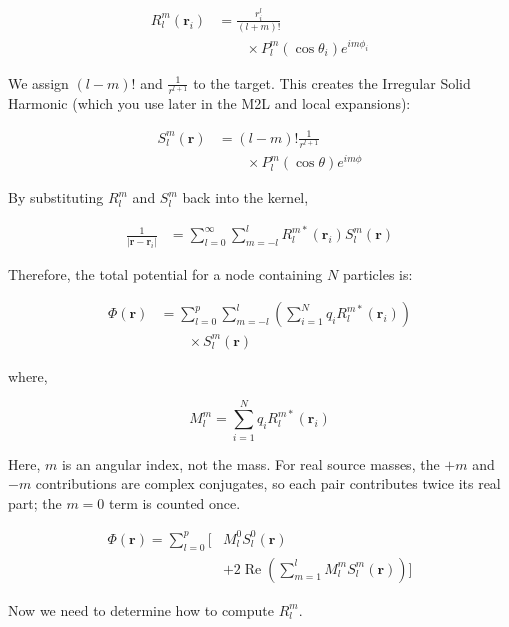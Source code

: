 \[
\begin{aligned}
R_l^m(\mathbf r_i)
&=\frac{r_i^l}{(l+m)!}\\
&\qquad\times P_l^m(\cos\theta_i)e^{im\phi_i}
\end{aligned}
\]

We assign $(l-m)!$ and $\frac{1}{r^{l+1}}$ to the target. This creates the Irregular Solid Harmonic (which you use later in the M2L and local expansions):

\[
\begin{aligned}
S_l^m(\mathbf r)
&=(l-m)!\frac{1}{r^{l+1}}\\
&\qquad\times P_l^m(\cos\theta)e^{im\phi}
\end{aligned}
\]

By substituting $R_{l}^{m}$ and $S_{l}^{m}$ back into the kernel,

\[
\begin{aligned}
\frac{1}{\left|\mathbf r-\mathbf r_i\right|}
&=\sum_{l=0}^{\infty}\sum_{m=-l}^{l}
R_l^{m*}(\mathbf r_i)S_l^m(\mathbf r)
\end{aligned}
\]

Therefore, the total potential for a node containing \(N\) particles is:

\[
\begin{aligned}
\Phi(\mathbf r)
&=\sum_{l=0}^{p}\sum_{m=-l}^{l}
\left(\sum_{i=1}^{N}q_iR_l^{m*}(\mathbf r_i)\right)\\
&\qquad\times S_l^m(\mathbf r)
\end{aligned}
\]

where,

\[
M_l^m=\sum_{i=1}^{N}q_iR_l^{m*}(\mathbf r_i)
\]

Here, $m$ is an angular index, not the mass. For real source masses, the $+m$ and $-m$ contributions are complex conjugates, so each pair contributes twice its real part; the $m=0$ term is counted once.

\[
\begin{aligned}
\Phi(\mathbf r)=\sum_{l=0}^{p}\Bigg[
&M_l^0S_l^0(\mathbf r)\\
&+2\operatorname{Re}\!\left(\sum_{m=1}^{l}
M_l^mS_l^m(\mathbf r)\right)\Bigg]
\end{aligned}
\]

Now we need to determine how to compute \(R_l^m\).
